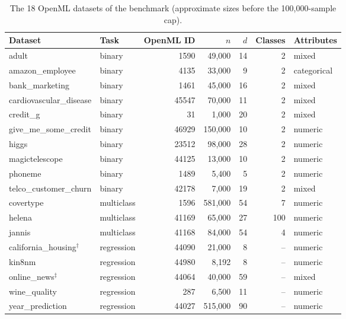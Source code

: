 \begin{table}[htbp]
\centering
\caption[The 18 datasets of the benchmark]{The 18 OpenML datasets of
the benchmark (approximate sizes before the 100{,}000-sample cap).}
\label{tab:datasets}
\small
\begin{tabular}{llrrrrl}
\toprule
Dataset & Task & OpenML ID & $n$ & $d$ & Classes & Attributes \\
\midrule
adult                   & binary & 1590  & 49{,}000  & 14 & 2 & mixed \\
amazon\_employee        & binary & 4135  & 33{,}000  & 9  & 2 & categorical \\
bank\_marketing         & binary & 1461  & 45{,}000  & 16 & 2 & mixed \\
cardiovascular\_disease & binary & 45547 & 70{,}000  & 11 & 2 & mixed \\
credit\_g               & binary & 31    & 1{,}000   & 20 & 2 & mixed \\
give\_me\_some\_credit  & binary & 46929 & 150{,}000 & 10 & 2 & numeric \\
higgs                   & binary & 23512 & 98{,}000  & 28 & 2 & numeric \\
magictelescope          & binary & 44125 & 13{,}000  & 10 & 2 & numeric \\
phoneme                 & binary & 1489  & 5{,}400   & 5  & 2 & numeric \\
telco\_customer\_churn  & binary & 42178 & 7{,}000   & 19 & 2 & mixed \\
\midrule
covertype               & multiclass & 1596  & 581{,}000 & 54 & 7   & numeric \\
helena                  & multiclass & 41169 & 65{,}000  & 27 & 100 & numeric \\
jannis                  & multiclass & 41168 & 84{,}000  & 54 & 4   & numeric \\
\midrule
california\_housing$^{\dagger}$ & regression & 44090 & 21{,}000  & 8  & -- & numeric \\
kin8nm                  & regression & 44980 & 8{,}192   & 8  & -- & numeric \\
online\_news$^{\ddagger}$ & regression & 44064 & 40{,}000  & 59 & -- & mixed \\
wine\_quality           & regression & 287   & 6{,}500   & 11 & -- & numeric \\
year\_prediction        & regression & 44027 & 515{,}000 & 90 & -- & numeric \\
\bottomrule
\end{tabular}
\end{table}

